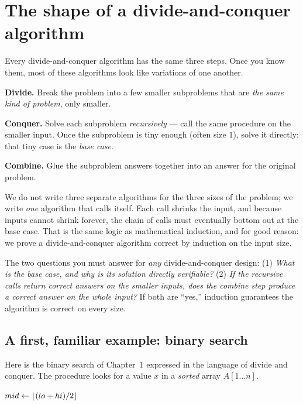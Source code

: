 \section{The shape of a divide-and-conquer algorithm}

Every divide-and-conquer algorithm has the same three steps. Once you know them,
most of these algorithms look like variations of one another.

\begin{intuitionbox}
\textbf{Divide.} Break the problem into a few smaller subproblems that are
\emph{the same kind of problem}, only smaller.

\textbf{Conquer.} Solve each subproblem \emph{recursively} --- call the same
procedure on the smaller input. Once the subproblem is tiny enough (often size
$1$), solve it directly; that tiny case is the \emph{base case}.

\textbf{Combine.} Glue the subproblem answers together into an answer for the
original problem.
\end{intuitionbox}

We do not
write three separate algorithms for the three sizes of the problem; we write
\emph{one} algorithm that calls itself. Each call shrinks the input, and because
inputs cannot shrink forever, the chain of calls must eventually bottom out at the
base case. That is the same logic as mathematical induction, and for good reason:
we prove a divide-and-conquer algorithm correct by induction on the input size.

\begin{focusbox}
The two questions you must answer for \emph{any} divide-and-conquer design:
(1) \emph{What is the base case, and why is its solution directly verifiable?}
(2) \emph{If the recursive calls return correct answers on the smaller inputs,
does the combine step produce a correct answer on the whole input?}
If both are ``yes,'' induction guarantees the algorithm is correct on every size.
\end{focusbox}

\subsection{A first, familiar example: binary search}

Here is the binary search of Chapter~1 expressed in the language of divide and
conquer. The procedure looks for a value $x$ in a \emph{sorted} array $A[1\ldots n]$.

\begin{algorithm}[H]
\caption{\textsc{Binary-Search}$(A, x, lo, hi)$}
$mid \gets \lfloor(lo+hi)/2\rfloor$\;
\end{algorithm}

